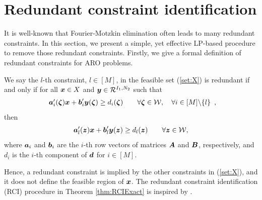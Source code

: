 \documentclass[fleqn,mnsc,blindrev]{informs4}
\newcommand{\mb}[1]{\mbox{\boldmath \ensuremath{#1}}}
\begin{document}
	
	
	\section{Redundant constraint identification} \label{sec:RCI}
	
	It is well-known that Fourier-Motzkin elimination often leads to many redundant constraints. In this section, we present a simple, yet effective LP-based procedure to remove those redundant constraints. Firstly, we give a formal definition of redundant constraints for ARO problems. 
	\begin{definition} \label{def:RC1}
		We say the $l$-th constraint, $l\in [M]$, in the feasible set (\ref{set:X})  is redundant if and only if  for all $\mb{x} \in X$ and $\mb{y}\in \mathcal{R}^{I_1,N_2}$ such that
\begin{equation}\label{con:RCI}
				\begin{array}{rcll}
					\mb{a}'_i(\mb{\zeta})\mb{x}+\mb{b}'_i \mb{y}(\mb{\zeta}) \geq d_i(\mb{\zeta}) \qquad \forall \mb{\zeta} \in  \mathcal{W}, \quad \forall i  \in [M] \backslash \{l\} 
				\end{array},
\end{equation}
			then 
\begin{equation}  \label{con:RCI2}
				\mb{a}'_l(\mb{z})\mb{x}+\mb{b}'_l \mb{y}(\mb{z}) \geq d_l(\mb{z})  \qquad \forall \mb{z}  \in \mathcal{W},
\end{equation}
			where $\mb{a}_i$ and $\mb{b}_i$ are the $i$-th row vectors of matrices $\mb{A}$ and $\mb{B}$, respectively, and $d_i$ is the $i$-th component of $\mb{d}$ for $i\in [M]$.
		\end{definition}
		
		Hence, a redundant constraint is implied by the other constraints in (\ref{set:X}), and it does not define the feasible region of $\mb{x}$. The redundant constraint identification (RCI) procedure in Theorem \ref{thm:RCIExact} is inspired by \cite{cmp89}.
		
\end{document}
